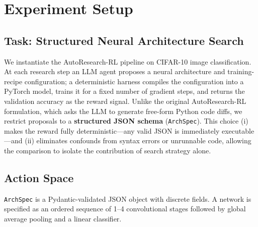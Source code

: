 
\section{Experiment Setup}
\label{sec:setup}

\subsection{Task: Structured Neural Architecture Search}
\label{sec:task}

We instantiate the AutoResearch-RL pipeline on CIFAR-10 image classification.
At each research step an LLM agent proposes a neural architecture and
training-recipe configuration; a deterministic harness compiles the
configuration into a PyTorch model, trains it for a fixed number of gradient
steps, and returns the validation accuracy as the reward signal.
Unlike the original AutoResearch-RL formulation, which asks the LLM to
generate free-form Python code diffs, we restrict proposals to a
\textbf{structured JSON schema} (\texttt{ArchSpec}).
This choice (i) makes the reward fully deterministic---any valid JSON is
immediately executable---and (ii) eliminates confounds from syntax errors or
unrunnable code, allowing the comparison to isolate the contribution of search
strategy alone.

\subsection{Action Space}
\label{sec:action_space}

\texttt{ArchSpec} is a Pydantic-validated JSON object with discrete fields.
A network is specified as an ordered sequence of 1--4 convolutional stages
followed by global average pooling and a linear classifier.

